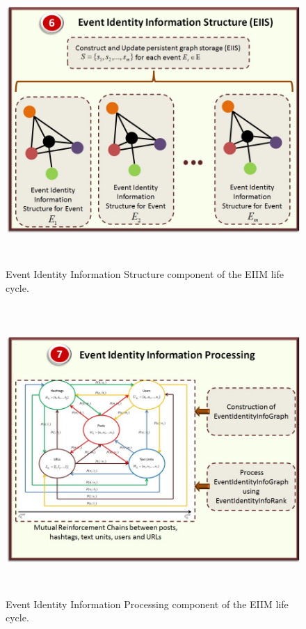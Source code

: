 \begin{figure}[htbp]
  \caption{Event Identity Information Structure component of the EIIM life cycle.}
  \centering
    \includegraphics[width=14cm,height=11cm]{Figures/EIIMComponents/EventIdentityInformationStructure.jpg}
\end{figure}


\begin{figure}[htbp]
  \caption{Event Identity Information Processing component of the EIIM life cycle.}
  \centering
    \includegraphics[width=14cm,height=11cm]{Figures/EIIMComponents/EventIdentityInformationProcessing.jpg}
\end{figure}

